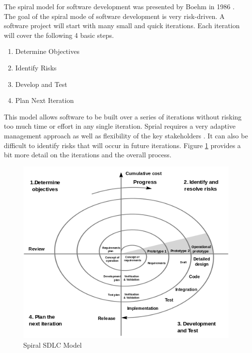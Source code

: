 \documentclass[SDSUThesis.tex]{subfiles}
\begin{document}
        The spiral model for software development was presented by Boehm in 1986
        \cite{Boehm1986, Boehm1988}. 
        The goal of the spiral mode of software development is very risk-driven.
        A software project will start with many small and quick iterations. 
        Each iteration will cover the following 4 basic steps. 
        \begin{enumerate}
            \item Determine Objectives
            \item Identify Risks
            \item Develop and Test
            \item Plan Next Iteration
        \end{enumerate}
        This model allows software to be built over a series of iterations
        without risking too much time or effort in any single iteration.
        Sprial requires a very adaptive management approach
        as well as flexibility of the key stakeholders \cite{Ruparelia2010}.
        It can also be difficult to identify risks that will occur in future
        iterations.
        Figure \ref{fig:spiral} provides a bit more detail on the iterations
        and the overall process. 
        \begin{figure}[here]
            \centering
            \includegraphics[scale=.5]{images/spiral_model.png}
            \caption[Spiral SDLC Model]{Spiral SDLC Model \cite{Boehm2000} }
            \label{fig:spiral}
        \end{figure}
        
\end{document}
